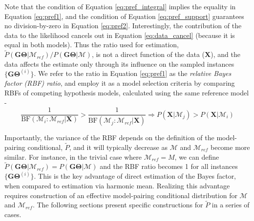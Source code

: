 \documentclass[11pt]{article}
\newcommand{\vect}[1]{\boldsymbol{\mathbf{#1}}}
\newcommand{\X}{\vect{X}}
\newcommand{\M}{\mathcal{M}}
\newcommand{\G}{\vect{G}}
\newcommand{\T}{\vect{\Theta}}
\newcommand{\GT}{\G\T}
\newcommand{\Mref}{\M_{ref}}
\newcommand{\Pref}{\widetilde{P}}
\newcommand{\rbf}{\text{BF}}
\newcommand{\1}{\mathbbm{1}}
\begin{document}
Note that the condition of Equation \ref{eq:pref_integral} implies the equality in Equation \ref{eq:pref1},
and the condition of Equation \ref{eq:pref_support} guarantees no division-by-zero in Equation \ref{eq:pref2}.
%
Interestingly, the contribution of the data to the likelihood cancels out in Equation \ref{eq:data_cancel} (because it is equal in both models).
%
Thus the ratio used for estimation, ${\Pref(\GT|\Mref) }/{P(\GT|\M)}$, is not a direct function of the data ($\X$),
and the data affects the estimate only through its influence on the sampled instances $\{\GT^{(i)}\}$.
%
We refer to the ratio in Equation \ref{eq:pref1} as the {\em relative Bayes factor (RBF) ratio}, and employ it as a model selection criteria by comparing RBFs of competing hypothesis models, calculated using the same reference model - 
\[ \frac{1}{\rbf(\M_i:\Mref|\X)} >  \frac{1}{\rbf(\M_j:\Mref|\X)} \Rightarrow P(\X|\M_j) >  P(\X|\M_i)\]


Importantly, the variance of the RBF depends on the definition of the model-pairing conditional, $\Pref$, and it will typically decrease as $\M$ and $\Mref$ become more similar.
%
For instance, in the trivial case where $\Mref=M$, we can define $\Pref(\GT|\Mref)=P(\GT|\M)$ and the RBF ratio becomes 1 for all instances $\{\GT^{(i)}\}$.
%
This is the key advantage of direct estimation of the Bayes factor, when compared to estimation via harmonic mean.
%
Realizing this advantage requires construction of an effective model-pairing conditional distribution for $\M$ and $\Mref$.
%
The following sections present specific constructions for $\Pref$ in a series of cases.
\end{document}
